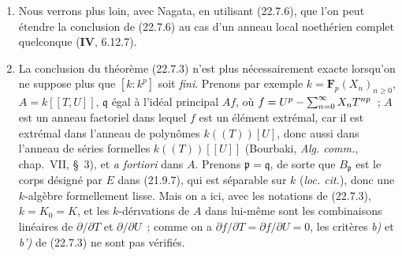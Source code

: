 \begin{remarks}[22.7.7]
\label{0.22.7.7-fr}
\begin{enumerate}
  \item[(i)] Nous verrons plus loin, avec Nagata, en utilisant (22.7.6), que
  l'on peut étendre la conclusion de (22.7.6) au cas d'un anneau local
  noethérien complet quelconque (\textbf{IV}, 6.12.7).

  \item[(ii)] La conclusion du théorème (22.7.3) n'est plus nécessairement
  exacte lorsqu'on ne suppose plus que $[k:k^p]$ soit \emph{fini}. Prenons par
  exemple $k=\mathbf F_p(X_n)_{n\geqslant0}$,
  $A=k[[T,U]]$, $\mathfrak q$ égal à l'idéal principal $Af$, où $f=U^p-\sum_{n=0}^{\infty}X_nT^{np}$~;
  $A$ est un anneau factoriel dans lequel $f$ est un élément extrémal, car il
  est extrémal dans l'anneau de polynômes $k((T))[U]$, donc aussi dans
  l'anneau de séries formelles $k((T))[[U]]$ (Bourbaki,
  \emph{Alg. comm.}, chap.~VII, §~3), et \emph{a fortiori} dans $A$.
  Prenons $\mathfrak p=\mathfrak q$, de sorte que $B_{\mathfrak p}$ est le
  corps désigné par $E$ dans (21.9.7), qui est séparable sur $k$
  (\emph{loc. cit.}), donc une $k$-algèbre formellement lisse. Mais on a ici,
  avec les notations de (22.7.3), $k=K_0=K$, et les $k$-dér{\i}vations de $A$
  dans lui-même sont les combinaisons linéaires de $\partial/\partial T$ et
  $\partial/\partial U$~; comme on a
  $\partial f/\partial T=\partial f/\partial U=0$, les critères \emph{b)} et \emph{b')} de
  (22.7.3) ne sont pas vérifiés.
\end{enumerate}
\end{remarks}
